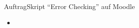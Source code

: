 \begin{frame}{Auftrag}{Skript \enquote{Error Checking} auf Moodle}
    \begin{itemize}
        \item {}
    \end{itemize}
\end{frame}